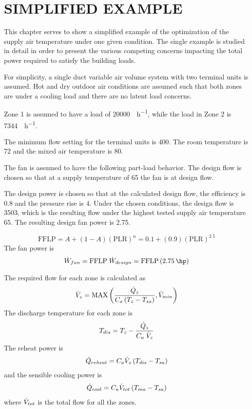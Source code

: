 \chapter{\texorpdfstring{\MakeUppercase{Simplified Example}}{Simplified Example}}

This chapter serves to show a simplified example of the optimization of
the supply air temperature under one given condition. The single example
is studied in detail in order to present the various competing concerns
impacting the total power required to satisfy the building loads. 

For simplicity, a single duct variable air volume system with two
terminal units is assumed. Hot and dry outdoor air conditions are
assumed such that both zones are under a cooling load and there are no
latent load concerns.  

Zone 1 is assumed to have a load of \SI{20000}{\btu\per\hour}, while the
load in Zone 2 is \SI{7344}{\btu\per\hour}. 

The minimum flow setting for the terminal units is \SI{400}{\cfm}. The
room temperature is \SI{72}{\degreeF} and the mixed air temperature is
\SI{80}{\degreeF}.

The fan is assumed to have the following part-load behavior. The design
flow is chosen so that at a supply temperature of \SI{65}{\degreeF} the
fan is at design flow. 

The design power is chosen so that at the calculated design flow, the
efficiency is \num{0.8} and the pressure rise is \SI{4}{\inchwater}.
Under the chosen conditions, the design flow is \SI{3503}{\cfm}, which
is the resulting flow under the highest tested supply air temperature
\SI{65}{\degreeF}. The resulting design fan power is \SI{2.75}{\hp}. 

\begin{equation}
    \text{FFLP} = A + \left(1-A\right)(\text{PLR})^{n} =   0.1 + (0.9)(\text{PLR})^{2.5}
\end{equation}
The fan power is 
\begin{equation}
    \dot{W}_{fan} = \text{FFLP} \; \dot{W}_{design} = \text{FFLP}\left(\SI{2.75}{\hp}\right) 
\end{equation}

The required flow for each zone is calculated as 
\begin{equation}
    \dot{V}_{z} = \text{MAX} \left( \frac{\dot{Q}_{z}}{C_{a}
    \left(T_{z} - T_{sa}\right)  }, \dot{V}_{min}  \right)
\end{equation}
The discharge temperature for each zone is
\begin{equation}
    T_{dis} = T_{z} - \frac{\dot{Q}_{z}}{C_{a} \; \dot{V}_{z}}
\end{equation}
The reheat power is 
\begin{equation}
    \dot{Q}_{reheat} = C_{a} \dot{V}_{z} \left(T_{dis} - T_{sa}\right)
\end{equation} 
and the sensible cooling power is 
\begin{equation}\label{eq:sensibleCoolingPower}
    \dot{Q}_{cool} = C_{a} \dot{V}_{tot} \left(T_{ma} - T_{sa}\right)
\end{equation} 
where \(\dot{V}_{tot}\) is the total flow for all the zones. 


